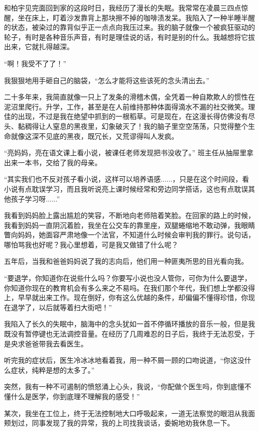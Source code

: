 和柏宇见完面回到家的这段时日，我经历了漫长的失眠。我常常在凌晨三四点惊醒，坐在床上，盯着沙发靠背上那块擦不掉的咖啡渍发呆。我陷入了一种半睡半醒的状态，被染过的靠背似乎正一点点向我压过来。我的脑子就像一个被疯狂驱动的轮子，有时是各种音乐声音，有时是理佳说的话，有时是别的什么。我越想将它拔出来，它就扎得越深。

“啊！我受不了了！”

我狠狠地用手砸自己的脑袋，“怎么才能将这些该死的念头清出去。”

二十多年来，我简直就像一只上了发条的滑稽木偶，全凭着一种自欺欺人的惯性在泥沼里爬行。升学，工作，甚至是在人前维持那种体面得滴水不漏的社交微笑。理佳的出现，不过是我在绝望中抓到的一根稻草。可是现在，在这漫长得仿佛没有尽头、黏稠得让人窒息的黑夜里，幻象破灭了！我的脑子里空空荡荡，只觉得整个生命就像这深不见底的黑夜，既冗长，又荒谬得叫人发疯。

“亮妈妈，亮在语文课上看小说，被课任老师发现把书没收了。” 班主任从抽屉里拿出来一本书，交给了我的母亲。

“其实我们也不反对孩子看小说，这样可以培养语感......，只是在这个时间段，看小说有点耽误学习，而且我听说亮上课时候经常和旁边同学搭话，这也有点耽误其他孩子学习呀......”

我看到妈妈脸上露出尴尬的笑容，不断地向老师陪着笑脸。在回家的路上的时候，我看到妈妈一直阴沉着脸，我坐在公交车的靠里座，双腿蜷缩地不敢动弹，我眼睛瞥向妈妈，她面容严肃地像一个法官，不知道什么时候会审判我的罪行。说句话，哪怕骂我也好呢？我心里想着，可是我又做错了什么呢？

五年后，当我和爸爸妈妈说了我的志向后，他们用一种匪夷所思的目光看向我。

“要退学，你知道你在说些什么吗？你要写小说也没人管你，可你为什么要退学，你知道你现在的教育机会有多么来之不易吗。在我们那个年代，我们想上学都没得上，早早就出来工作。现在倒好，你有这么优越的条件，却偏偏不懂得珍惜，你现在退学了，以后就等着扫大街吧！”

我陷入了长久的失眠中，脑海中的念头犹如一首不停循环播放的音乐一般，但是我既没有暂停键也无法调控音量。在经历了几周难忍的日子后，我终于无法忍受，于是央求爸爸带我去看医生。

听完我的症状后，医生冷冰冰地看着我，用一种不屑一顾的口吻说道，“你这没什么症状，纯粹是想的太多了。”

突然，我有一种不可遏制的愤怒涌上心头，我说，“你配做个医生吗，你到底懂不懂什么是医学，你到底理不理解我的感受！”

某次，我坐在工位上，终于无法控制地大口呼吸起来，一道无法察觉的眼泪从我面颊划过，同事发现了我的异常，我的上司找我谈话，委婉地劝我休息一下。
